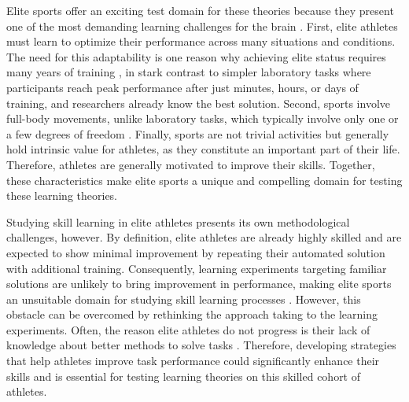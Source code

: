 Elite sports offer an exciting test domain for these theories because they present one of the most demanding learning challenges for the brain \cite{walsh_is_2014}. First, elite athletes must learn to optimize their performance across many situations and conditions\cite{mangalam_investigating_2023, du_relationship_2022, krakauer_motor_2019}. The need for this adaptability is one reason why achieving elite status requires many years of training \cite{krakauer_motor_2019}, in stark contrast to simpler laboratory tasks where participants reach peak performance after just minutes, hours, or days of training, and researchers already know the best solution. Second, sports involve full-body movements, unlike laboratory tasks, which typically involve only one or a few degrees of freedom \cite{du_relationship_2022}. Finally, sports are not trivial activities but generally hold intrinsic value for athletes, as they constitute an important part of their life. Therefore, athletes are generally motivated to improve their skills. Together, these characteristics make elite sports a unique and compelling domain for testing these learning theories.

Studying skill learning in elite athletes presents its own methodological challenges, however. By definition, elite athletes are already highly skilled and are expected to show minimal improvement by repeating their automated solution with additional training\cite{ericsson_development_2003, ericsson_expert_1994, ericsson_scientific_1998}. Consequently, learning experiments targeting familiar solutions are unlikely to bring improvement in performance, making elite sports an unsuitable domain for studying skill learning processes  \cite{thorndike_educational_1913, ericsson_development_2003, grayloooooong, grayshort, ericsson_scientific_1998}. However, this obstacle can be overcomed by rethinking the approach taking to the learning experiments. Often, the reason elite athletes do not progress is their lack of knowledge about better methods to solve tasks \cite{grayloooooong, grayshort, thorndike_educational_1913}. Therefore, developing strategies that help athletes improve task performance could significantly enhance their skills and is essential for testing learning theories on this skilled cohort of athletes. 


